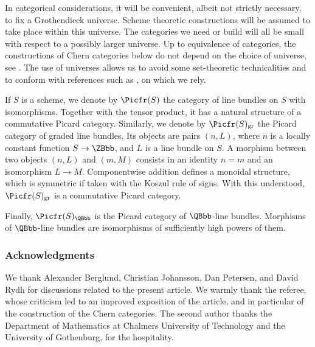 In categorical considerations, it will be convenient, albeit not strictly necessary, to fix a Grothendieck universe. Scheme theoretic constructions will be assumed to take place within this universe. The categories we need or build will all be small with respect to a possibly larger universe. Up to equivalence of categories, the constructions of Chern categories below do not depend on the choice of universe, see \cite[App.\,F]{ThomasonTrobaugh}. The use of universes allows us to avoid some set-theoretic technicalities and to conform with references such as \cite{ThomasonTrobaugh}, on which we rely.

If $S$ is a scheme, we denote by $\Picfr(S)$ the category of line bundles on $S$ with isomorphisms. Together with the tensor product, it has a natural structure of a commutative Picard category. Similarly, we denote by $\Picfr(S)_{\mathrm{gr}}$ the Picard category of graded line bundles. Its objects are pairs $(n,L)$, where $n$ is a locally constant function $S\to\ZBbb$, and $L$ is a line bundle on $S$. A morphism between two objects $(n,L)$ and $(m,M)$ consists in an identity $n=m$ and an isomorphism $L\to M$. Componentwise addition defines a monoidal structure, which is symmetric if taken with the Koszul rule of signs. With this understood, $\Picfr(S)_{\mathrm{gr}}$ is a commutative Picard category.

Finally, $\Picfr(S)_{\QBbb}$ is the Picard category of $\QBbb$-line bundles. Morphisms of $\QBbb$-line bundles are isomorphisms of sufficiently high powers of them.

\subsubsection*{Acknowledgments}
We thank Alexander Berglund, Christian Johansson, Dan Petersen, and David Rydh for discussions related to the present article. We warmly thank the referee, whose criticism led to an improved exposition of the article, and in particular of the construction of the Chern categories. The second author thanks the Department of Mathematics at Chalmers University of Technology and the University of Gothenburg, for the hospitality.

